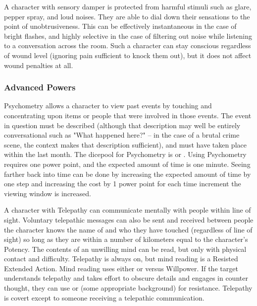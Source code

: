  A character with sensory damper is protected from harmful stimuli such as glare, pepper spray, and loud noises. They are able to dial down their sensations to the point of unobtrusiveness. This can be effectively instantaneous in the case of bright flashes, and highly selective in the case of filtering out noise while listening to a conversation across the room. Such a character can stay conscious regardless of wound level (ignoring pain sufficient to knock them out), but it does not affect wound penalties at all.


\subsubsection{Advanced Powers}

 Psychometry allows a character to view past events by touching and concentrating upon items or people that were involved in those events. The event in question must be described (although that description may well be entirely conversational such as "What happened here?" -- in the case of a brutal crime scene, the context makes that description sufficient), and must have taken place within the last month. The dicepool for Psychometry is  or . Using Psychometry requires one power point, and the expected amount of time is one minute. Seeing farther back into time can be done by increasing the expected amount of time by one step and increasing the cost by 1 power point for each time increment the viewing window is increased.

 A character with Telepathy can communicate mentally with people within line of sight. Voluntary telepathic messages can also be sent and received between people the character knows the name of and who they have touched (regardless of line of sight) so long as they are within a number of kilometers equal to the character's Potency. The contents of an unwilling mind can be read, but only with physical contact and difficulty. Telepathy is always on, but mind reading is a Resisted Extended Action. Mind reading uses either  or  versus Willpower. If the target understands telepathy and takes effort to obscure details and engages in counter thought, they can use  or  (some appropriate background) for resistance. Telepathy is covert except to someone receiving a telepathic communication.

